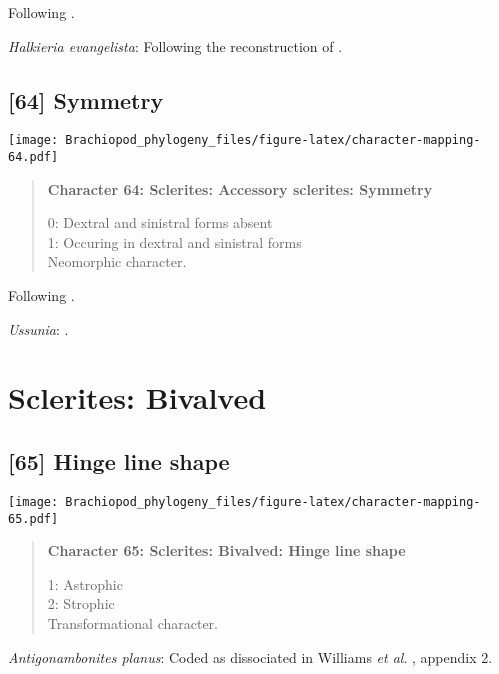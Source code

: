 \documentclass[openany]{book}
\theoremstyle{definition}
\theoremstyle{definition}
\theoremstyle{definition}
\theoremstyle{remark}
\begin{document}
Following \citet{Zhao2017}.

\hypertarget{Halkieria_evangelista-coding-63}{}
\emph{Halkieria evangelista}: Following the reconstruction of
\citet{Skovsted2015Theearly}.

\subsection*{{[}64{]} Symmetry}\label{symmetry}

\texttt{[image: Brachiopod\_phylogeny\_files/figure-latex/character-mapping-64.pdf]}

\begin{quote}
\textbf{Character 64: Sclerites: Accessory sclerites: Symmetry}

0: Dextral and sinistral forms absent\\
1: Occuring in dextral and sinistral forms\\
Neomorphic character.
\end{quote}

Following \citet{Zhao2017}.

\hypertarget{Ussunia-coding-64}{}
\emph{Ussunia}: \citet{Skovsted2008Thescleritome}.

\section{Sclerites: Bivalved}\label{sclerites-bivalved}

\subsection*{{[}65{]} Hinge line shape}\label{hinge-line-shape}

\texttt{[image: Brachiopod\_phylogeny\_files/figure-latex/character-mapping-65.pdf]}

\begin{quote}
\textbf{Character 65: Sclerites: Bivalved: Hinge line shape}

1: Astrophic\\
2: Strophic\\
Transformational character.
\end{quote}

\hypertarget{Antigonambonites_planus-coding-65}{}
\emph{Antigonambonites planus}: Coded as dissociated in Williams
\emph{et al}. \citeyearpar{Williams1998Thediversity}, appendix 2.
\end{document}
